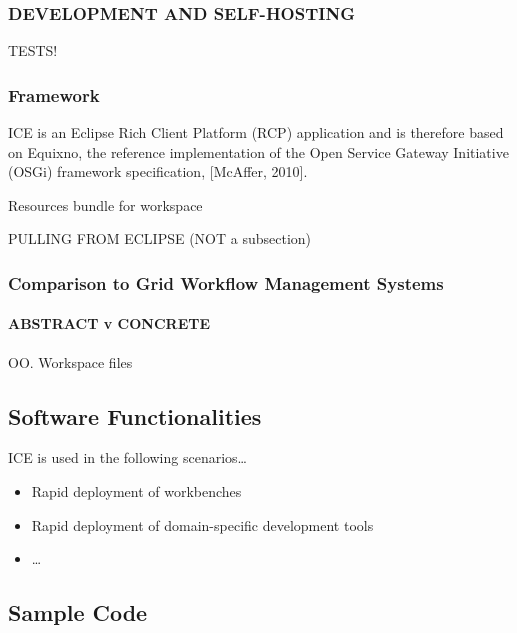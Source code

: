 \subsubsection{DEVELOPMENT AND
SELF-HOSTING}\label{development-and-self-hosting}

TESTS!

\subsubsection{Framework}\label{framework}

ICE is an Eclipse Rich Client Platform (RCP) application and is
therefore based on Equixno, the reference implementation of the Open
Service Gateway Initiative (OSGi) framework specification, {[}McAffer,
2010{]}.

Resources bundle for workspace

PULLING FROM ECLIPSE (NOT a subsection)

\subsubsection{Comparison to Grid Workflow Management
Systems}\label{comparison-to-grid-workflow-management-systems}

\paragraph{ABSTRACT v CONCRETE}\label{abstract-v-concrete}

OO. Workspace files

\subsection{Software Functionalities}\label{software-functionalities}

ICE is used in the following scenarios\ldots{}

\begin{itemize}
\itemsep1pt\parskip0pt
\item
  Rapid deployment of workbenches
\item
  Rapid deployment of domain-specific development tools
\item
  \ldots{}
\end{itemize}

\subsection{Sample Code}\label{sample-code}

